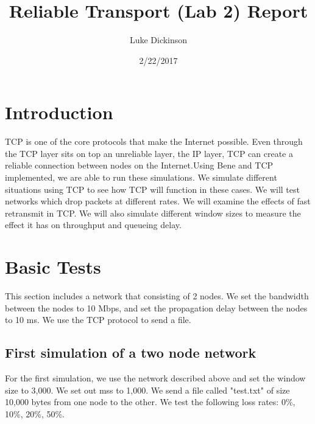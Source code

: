 \documentclass[fleqn,11pt]{article}
\begin{document}
\lstset{
  language=Python,
  basicstyle=\small,          %
  keywordstyle=\bfseries,
  identifierstyle=,           %
  commentstyle=,              %
  stringstyle=\ttfamily,      %
  showstringspaces=false,     %
  numbers=left,
  numberstyle=\tiny,
  numbersep=5pt,
  frame=tb,
}

\title{Reliable Transport (Lab 2) Report}

\author{Luke Dickinson}

\date{2/22/2017}

\maketitle

\section{Introduction}

TCP is one of the core protocols that make the Internet possible. Even through the TCP layer sits on top an unreliable layer, the IP layer, TCP can create a reliable connection between nodes on the Internet.Using Bene and TCP implemented, we are able to run these simulations. We simulate different situations using TCP to see how TCP will function in these cases. We will test networks which drop packets at different rates. We will examine the effects of fast retransmit in TCP. We will also simulate different window sizes to measure the effect it has on throughput and queueing delay. 

\section{Basic Tests}
This section includes a network that consisting of 2 nodes. We set the bandwidth between the nodes to 10 Mbps, and set the propagation delay between the nodes to 10 ms.  We use the TCP protocol to send a file.

 \subsection{First simulation of a two node network}
For the first simulation, we use the network described above and set the window size to 3,000. We set out mss to 1,000. We send a file called "test.txt" of size 10,000 bytes from one node to the other. We test the following loss rates: 0\%, 10\%, 20\%, 50\%.
\end{document}
